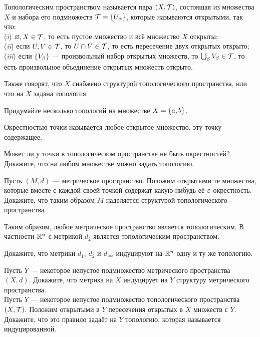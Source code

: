 \documentclass[a4paper,12pt]{article}
\begin{document}

    Топологическим пространством называется пара $(X,\mathcal{T})$, состоящая из множества $X$ и набора его подмножеств $\mathcal{T}=\left\{U_\alpha\right\}$, которые называются  открытыми, так что:\\
    ({\it i\/}) $\varnothing,X\in\mathcal{T}$, то есть пустое множество и всё множество $X$ открыты;\\
    ({\it ii\/}) если $U,V\in\mathcal{T}$, то $U\cap V\in\mathcal{T}$, то есть пересечение двух открытых открыто;\\
    ({\it iii\/}) если $\left\{V_\beta\right\}$ --- произвольный набор открытых множеств, то $\bigcup_\beta V_\beta\in\mathcal{T}$, то есть произвольное объединение открытых множеств открыто.

    Также говорят, что $X$ снабжено структурой топологического пространства, или что на $X$ задана топология.


    Придумайте несколько топологий на множестве $X=\left\{a,b\right\}$.

     Окрестностью точки называется любое открытое множество, эту точку содержащее.

    Может ли у точки в топологическом пространстве не быть окрестностей?\\
    Докажите, что на любом множестве можно задать топологию.


    Пусть $(M,d)$ --- метрическое пространство. Положим открытыми те множества, которые вместе с каждой своей точкой содержат какую-нибудь её $\varepsilon$-окрестность. Докажите, что таким образом  $M$ наделяется структурой топологического пространства.

Таким образом, любое метрическое пространство является топологическим. В частности $\mathbb{R}^n$ с метрикой $d_2$ является топологическим пространством.

    Докажите, что метрики $d_1$, $d_2$ и $d_\infty$ индуцируют на $\mathbb{R}^n$ одну и ту же топологию.


    Пусть $Y$ --- некоторое непустое подмножество метрического пространства $(X,d)$. Докажите, что метрика на $X$ индуцирует на $Y$ структуру метрического пространства.\\
    Пусть $Y$ --- некоторое непустое подмножество топологического пространства $(X,\mathcal{T})$. Положим открытыми в $Y$ пересечения открытых в $X$ множеств с $Y$. Докажите, что это правило задаёт на $Y$ топологию, которая называется  индуцированной.
\end{document}
